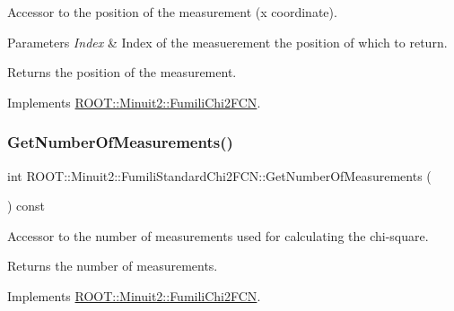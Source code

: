 Accessor to the position of the measurement (x coordinate).


\begin{DoxyParams}{Parameters}
{\em Index} & Index of the measuerement the position of which to return.\\
\hline
\end{DoxyParams}
\begin{DoxyReturn}{Returns}
the position of the measurement. 
\end{DoxyReturn}


Implements \mbox{\hyperlink{classROOT_1_1Minuit2_1_1FumiliChi2FCN_a1831875c53596cd4aa52ea536de53b60}{R\+O\+O\+T\+::\+Minuit2\+::\+Fumili\+Chi2\+F\+CN}}.

\mbox{\label{classROOT_1_1Minuit2_1_1FumiliStandardChi2FCN_a27414beb35c9c18156e6b3781aaf587f}} 
\subsubsection{\texorpdfstring{GetNumberOfMeasurements()}{GetNumberOfMeasurements()}\hspace{0.1cm}{\footnotesize\ttfamily [1/2]}}
{\footnotesize\ttfamily int R\+O\+O\+T\+::\+Minuit2\+::\+Fumili\+Standard\+Chi2\+F\+C\+N\+::\+Get\+Number\+Of\+Measurements (\begin{DoxyParamCaption}{ }\end{DoxyParamCaption}) const\hspace{0.3cm}{\ttfamily [virtual]}}

Accessor to the number of measurements used for calculating the chi-\/square.

\begin{DoxyReturn}{Returns}
the number of measurements. 
\end{DoxyReturn}


Implements \mbox{\hyperlink{classROOT_1_1Minuit2_1_1FumiliChi2FCN_afa1acb8484d1c1825de0dd641e301717}{R\+O\+O\+T\+::\+Minuit2\+::\+Fumili\+Chi2\+F\+CN}}.

